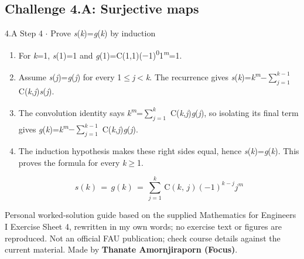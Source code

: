 \documentclass[11pt]{article}
\begin{document}
\begin{keepsection}\subsection{Challenge 4.A: Surjective maps}

\begin{workedbox}{4.A Step 4 \ensuremath{\cdot} Prove \textit{s}(\textit{k})=\textit{g}(\textit{k}) by induction}
\begin{enumerate}
\item For \textit{k}=1, \textit{s}(1)=1 and \textit{g}(1)=C(1,1)(\ensuremath{-}1)\textsuperscript{0}1\textsuperscript{\textit{m}}=1.
\item Assume \textit{s}(\textit{j})=\textit{g}(\textit{j}) for every 1\ensuremath{\leq}\textit{j}\ensuremath{<}\textit{k}. The recurrence gives \textit{s}(\textit{k})=\textit{k}\textsuperscript{\textit{m}}\ensuremath{-}$\sum_{{j}=1}^{{k}-1} $ C(\textit{k},\textit{j})\textit{s}(\textit{j}).
\item The convolution identity says \textit{k}\textsuperscript{\textit{m}}=$\sum_{{j}=1}^{{k}} $ C(\textit{k},\textit{j})\textit{g}(\textit{j}), so isolating its final term gives \textit{g}(\textit{k})=\textit{k}\textsuperscript{\textit{m}}\ensuremath{-}$\sum_{{j}=1}^{{k}-1} $ C(\textit{k},\textit{j})\textit{g}(\textit{j}).
\item {}
The induction hypothesis makes these right sides equal, hence \textit{s}(\textit{k})=\textit{g}(\textit{k}). This proves the formula for every \textit{k}\ensuremath{\geq}1.

\begin{equation*}{s}({k})\, =\, {g}({k})\, =\, \sum_{{j}=1}^{{k}} \, \mathrm{C}({k},\, {j})(-1)^{{k}-{j}}{j}^{{m}}\end{equation*}
\end{enumerate}
\end{workedbox}

\end{keepsection}

\vfill{\small Personal worked-solution guide based on the supplied Mathematics for Engineers I Exercise Sheet 4, rewritten in my own words; no exercise text or figures are reproduced. Not an official FAU publication; check course details against the current material. Made by \textbf{Thanate Amornjiraporn (Focus)}.}
\end{document}
